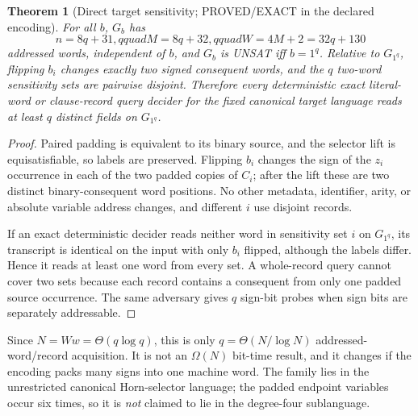 \documentclass[11pt]{article}
\newtheorem{theorem}{Theorem}
\begin{document}
\begin{theorem}[Direct target sensitivity; PROVED/EXACT in the declared encoding]
For all $b$, $G_b$ has
\[
n=8q+31,qquad M=8q+32,qquad W=4M+2=32q+130
\]
addressed words, independent of $b$, and $G_b$ is UNSAT iff $b=1^q$.  Relative to $G_{1^q}$, flipping $b_i$ changes exactly two signed consequent words, and the $q$ two-word sensitivity sets are pairwise disjoint.  Therefore every deterministic exact literal-word or clause-record query decider for the fixed canonical target language reads at least $q$ distinct fields on $G_{1^q}$.
\end{theorem}
\begin{proof}
Paired padding is equivalent to its binary source, and the selector lift is equisatisfiable, so labels are preserved.  Flipping $b_i$ changes the sign of the $z_i$ occurrence in each of the two padded copies of $C_i$; after the lift these are two distinct binary-consequent word positions.  No other metadata, identifier, arity, or absolute variable address changes, and different $i$ use disjoint records.

If an exact deterministic decider reads neither word in sensitivity set $i$ on $G_{1^q}$, its transcript is identical on the input with only $b_i$ flipped, although the labels differ.  Hence it reads at least one word from every set.  A whole-record query cannot cover two sets because each record contains a consequent from only one padded source occurrence.  The same adversary gives $q$ sign-bit probes when sign bits are separately addressable.
\end{proof}

Since $N=Ww=\Theta(q\log q)$, this is only
$q=\Theta(N/\log N)$ addressed-word/record acquisition.  It is not an $\Omega(N)$ bit-time result, and it changes if the encoding packs many signs into one machine word.  The family lies in the unrestricted canonical Horn-selector language; the padded endpoint variables occur six times, so it is \emph{not} claimed to lie in the degree-four sublanguage.
\end{document}
